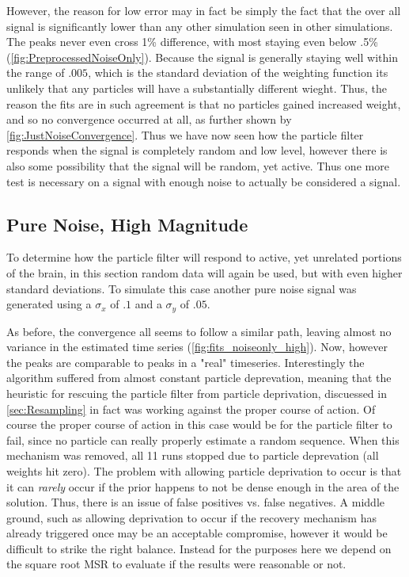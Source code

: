 However, the reason for low error may in fact be simply the fact that the over all
signal is significantly lower than any other simulation seen in other simulations.
The peaks never even cross 1\% difference, with most staying even below .5\% 
(\autoref{fig:PreprocessedNoiseOnly}). Because the signal is generally staying
well within the range of $.005$, which is the standard deviation of the weighting function
its unlikely that any particles will have a substantially different wieght. Thus, the reason
the fits are in such agreement is that no particles gained increased weight, and so
no convergence occurred at all, as further shown by \autoref{fig:JustNoiseConvergence}. 
Thus we have now seen how the particle filter responds when the signal is completely
random and low level, however there is also some possibility that the signal will
be random, yet active. Thus one more test is necessary on
a signal with enough noise to actually be considered a signal. 

\subsection{Pure Noise, High Magnitude}
\label{sec:PureNoiseHighMag}
To determine how the particle filter will respond to active, yet unrelated
portions of the brain, in this section random data will again be used, but
with even higher standard deviations. To simulate this case another
pure noise signal was generated using a $\sigma_x$ of $.1$ and a $\sigma_y$ of $.05$.

As before, the convergence all seems to follow a similar path, leaving almost no
variance in the estimated time series (\autoref{fig:fits_noiseonly_high}). Now, however
the peaks are comparable to peaks in a "real" timeseries. Interestingly the algorithm
suffered from almost constant particle deprevation, meaning that the heuristic
for rescuing the particle filter from particle deprivation, discuessed in
\autoref{sec:Resampling} in fact was working against the proper course of action. Of course
 the proper course of action in this case would be for the particle filter to fail,
 since no particle can really properly estimate a random sequence. When this mechanism
 was removed, all 11 runs stopped due to particle deprevation (all weights hit zero). 
 The problem with allowing particle deprivation to occur is that it can \emph{rarely}
 occur if the prior happens to not be dense enough in the area of the solution. Thus,
 there is an issue of false positives vs. false negatives. A middle ground, such as 
 allowing deprivation to occur if the recovery mechanism has already triggered once
 may be an acceptable compromise, however it would be difficult to strike the 
 right balance. Instead for the purposes here we depend on the square root MSR to 
 evaluate if the results were reasonable or not. 

